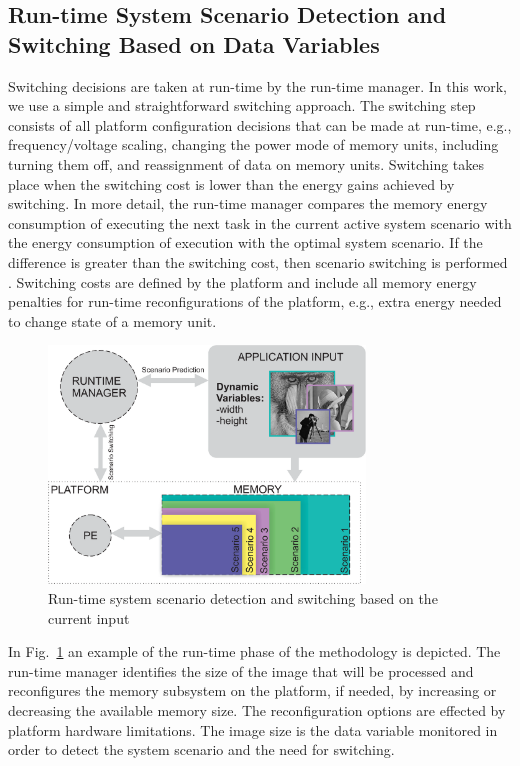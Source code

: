 \documentclass[smallcondensed]{svjour3}
\begin{document}
\subsection{Run-time System Scenario Detection and Switching Based on Data Variables}

Switching decisions are taken at run-time by the run-time manager. 
In this work, we use a simple and straightforward switching approach.
The switching step consists of all platform configuration decisions that can be made at run-time, e.g., frequency/voltage scaling, changing the power mode of memory units, including turning them off, and reassignment of data on memory units. 
Switching takes place when the switching cost is lower than the energy gains achieved by switching. 
In more detail, the run-time manager compares the memory energy consumption of executing the next task in the current active system scenario with the energy consumption of execution with the optimal system scenario. 
If the difference is greater than the switching cost, then scenario switching is performed \cite{tcm}. 
Switching costs are defined by the platform and include all memory energy penalties for run-time reconfigurations of the platform, e.g., extra energy needed to change state of a memory unit.

\begin{figure}
\centering
\includegraphics[width=0.75\textwidth]{Images/switching.eps}
\caption{Run-time system scenario detection and switching based on the current input}
\label{fig:runtime}
\end{figure}

In Fig.~\ref{fig:runtime} an example of the run-time phase of the methodology is depicted. 
The run-time manager identifies the size of the image that will be processed and reconfigures the memory subsystem on the platform, if needed, by increasing or decreasing the available memory size. 
The reconfiguration options are effected by platform hardware limitations. 
The image size is the data variable monitored in order to detect the system scenario and the need for switching.
\end{document}
